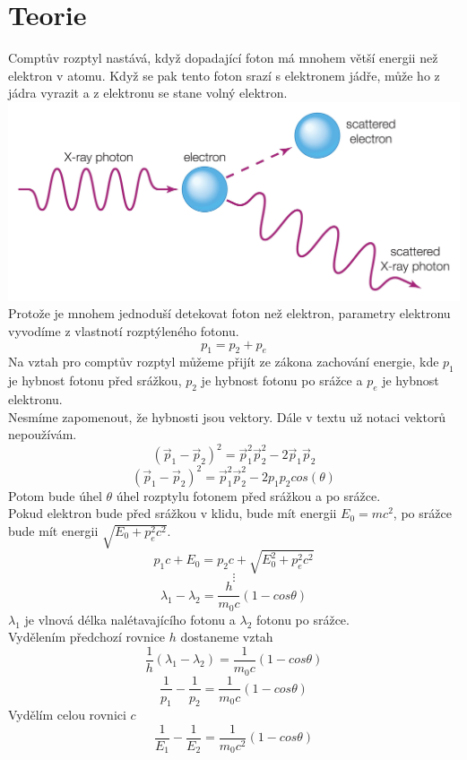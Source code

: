 \documentclass{article}
\begin{document}
\section{Teorie}
Comptův rozptyl nastává, když dopadající foton má mnohem větší energii než elektron v atomu.
Když se pak tento foton srazí s elektronem jádře, může ho z jádra vyrazit a z elektronu se stane volný elektron.\\
\includegraphics[scale=0.08]{comp.jpg}\\
Protože je mnohem jednoduší detekovat foton než elektron, parametry elektronu vyvodíme z vlastnotí rozptýleného fotonu.
$$p_{1} = p_{2} + p_{e}$$
Na vztah pro comptův rozptyl můžeme přijít ze zákona zachování energie, kde $p_{1}$ je hybnost fotonu před srážkou, $p_{2}$ je hybnost fotonu po srážce a $p_{e}$ je hybnost elektronu.\\
Nesmíme zapomenout, že hybnosti jsou vektory. Dále v textu už notaci vektorů nepoužívám.
$$(\vec{p}_{1} - \vec{p}_{2})^{2} = \vec{p}_{1}^{2} \vec{p}_{2}^{2} -2\vec{p}_{1}\vec{p}_{2}$$
$$(\vec{p}_{1} - \vec{p}_{2})^{2} = \vec{p}_{1}^{2} \vec{p}_{2}^{2} -2p_{1}p_{2}cos(\theta)$$
Potom bude úhel $\theta$ úhel rozptylu fotonem před srážkou a po srážce.\\
Pokud elektron bude před srážkou v klidu, bude mít energii $E_{0} = mc^{2}$, po srážce bude
mít energii $\sqrt{E_{0} + p^{2}_{e}c^{2}}$.
$$p_{1}c + E_{0} = p_{2}c + \sqrt{E_{0}^{2} + p_{e}^{2}c^{2}}$$
$$\vdots$$
\begin{equation}\label{eq:1}
  \lambda_{1} - \lambda_{2} = \frac{h}{m_{0}c} (1-cos\theta)
\end{equation}
$\lambda_{1}$ je vlnová délka nalétavajícího fotonu a $\lambda_{2}$ fotonu po srážce.\\
Vydělením předchozí rovnice $h$ dostaneme vztah\\
$$\frac{1}{h} (\lambda_{1} - \lambda_{2}) = \frac{1}{m_{0}c} (1-cos\theta)$$
$$\frac{1}{p_{1}} - \frac{1}{p_{2}} = \frac{1}{m_{0}c} (1-cos\theta)$$
Vydělím celou rovnici $c$\\
\begin{equation}\label{eq:2}
  \frac{1}{E_{1}} - \frac{1}{E_{2}} = \frac{1}{m_{0}c^{2}} (1-cos\theta)
\end{equation}
\end{document}
